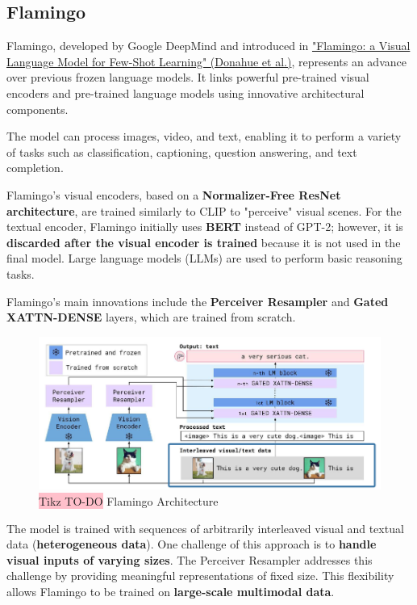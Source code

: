 \subsection{Flamingo}

Flamingo, developed by Google DeepMind and introduced in \href{https://arxiv.org/pdf/2204.14198}{"Flamingo: a Visual Language Model for Few-Shot Learning" (Donahue et al.)}, represents an advance over previous frozen language models. It links powerful pre-trained visual encoders and pre-trained language models using innovative architectural components.

The model can process images, video, and text, enabling it to perform a variety of tasks such as classification, captioning, question answering, and text completion.

Flamingo's visual encoders, based on a \textbf{Normalizer-Free ResNet architecture}, are trained similarly to CLIP to "perceive" visual scenes. For the textual encoder, Flamingo initially uses \textbf{BERT} instead of GPT-2; however, it is \textbf{discarded after the visual encoder is trained} because it is not used in the final model. Large language models (LLMs) are used to perform basic reasoning tasks.

Flamingo's main innovations include the \textbf{Perceiver Resampler} and \textbf{Gated XATTN-DENSE} layers, which are trained from scratch.

\begin{figure}[!htbp]
    \centering
    \includegraphics[width=\linewidth]{tikz/chapter11 - Flamingo Architecture.png}
    \caption{{\color{red}\colorbox{pink}{Tikz TO-DO}} Flamingo Architecture}
\end{figure}

The model is trained with sequences of arbitrarily interleaved visual and textual data (\textbf{heterogeneous data}). One challenge of this approach is to \textbf{handle visual inputs of varying sizes}. The Perceiver Resampler addresses this challenge by providing meaningful representations of fixed size. This flexibility allows Flamingo to be trained on \textbf{large-scale multimodal data}.

